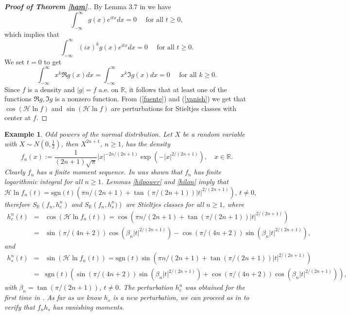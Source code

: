 \documentclass{amsart}
\newtheorem{example}[theorem]{Example}
\newcommand{\R}{\mathbb{R}}
\newcommand{\INT}{\int_{-\infty}^{\infty}}
\begin{document}
\begin{proof}[\textbf{Proof of Theorem \ref{ham}}.]
By Lemma 3.7 in \cite[page 59]{Garnett} we have
$$\INT g(x)e^{itx}dx =0\quad \text{ for all } t\geq 0, $$
which implies that 
$$\INT (ix)^k g(x)e^{itx}dx =0\quad \text{ for all } t\geq 0. $$
We set $t=0$ to get
\begin{equation}\label{vanish}
\INT x^k \Re g(x) dx= \INT x^k \Im g(x) dx= 0\quad \text{ for all } k\geq 0.
\end{equation}
Since $f$ is a density and $|g|=f$ a.e. on $\R$, it follows that at least one of the functions $\Re g, \Im g$ is a nonzero function. From (\ref{fuente}) and (\ref{vanish}) we get that $\cos(\mathcal{H}\ln f)$ and $\sin(\mathcal{H}\ln f)$ are perturbations for Stieltjes classes with center at $f$.
\end{proof}

\begin{example} Odd powers of the normal distribution. Let $X$ be a random variable with $X \sim N(0,\frac{1}{2})$, then $X^{2n+1}$, $n\geq 1$, has the density
$$f_{n}(x):=\frac{1}{(2n+1)\sqrt{\pi}}|x|^{-2n/(2n+1)}\exp(-|x|^{2/(2n+1)}), \quad x\in \R.$$ 
Clearly $f_n$ has a finite moment sequence. In \cite{Stoyanov4} was shown that $f_{n}$ has finite logarithmic integral for all $n \geq 1$. Lemmas \ref{hilpower} and \ref{hilon} imply that
$$\mathcal{H}\ln f_n(t)=\text{sgn}(t)\left( \pi n/(2n+1)+\tan\left( \pi /(2n+1)\right)|t|^{2/(2n+1)} \right), \, t\neq 0,$$
therefore $S_{\mathbb{R}}\left( f_n,h_c^n \right) $ and $S_{\mathbb{R}}\left( f_n,h_s^n) \right) $ are Stieltjes classes for all $n\geq 1$, where
\begin{eqnarray*}
h_c^n(t)&=&\cos(\mathcal{H}\ln f_n(t))=\cos\left( \pi n/(2n+1)+\tan\left( \pi /(2n+1)\right)|t|^{2/(2n+1)} \right)\\
              &=& \sin(\pi/(4n+2))\cos(\beta_n|t|^{2/(2n+1)})-  \cos(\pi/(4n+2))\sin(\beta_n|t|^{2/(2n+1)}), %
\end{eqnarray*}
and
\begin{eqnarray*}
h_s^n(t)&=&\sin(\mathcal{H}\ln f_n(t))=\text{sgn}(t)\sin\left( \pi n/(2n+1)+\tan\left( \pi /(2n+1)\right)|t|^{2/(2n+1)} \right)\\
             &=&\text{sgn}(t) \left(\sin(\pi/(4n+2))\sin(\beta_n|t|^{2/(2n+1)})+  \cos(\pi/(4n+2))\cos(\beta_n|t|^{2/(2n+1)})\right),
\end{eqnarray*}
with $\beta_n=\tan\left( \pi /(2n+1)\right)$, $t\neq 0$. The perturbation $h_c^n$ was obtained for the first time in \cite{Berg}. As far as we know $h_s$ is a new perturbation, we can proceed as in \cite{Berg} to verify that $f_n h_s$ has vanishing moments.
\end{example}
\end{document}
